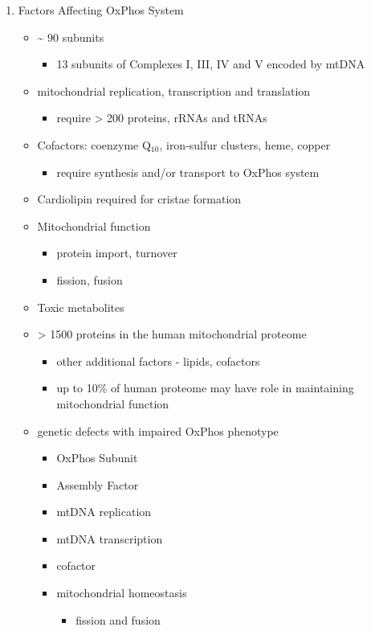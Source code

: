 \documentclass{scrartcl}
\begin{document}
\begin{enumerate}
\item Factors Affecting OxPhos System
\label{sec:org8dfa63d}
\begin{itemize}
\item \textasciitilde{} 90 subunits
\begin{itemize}
\item 13 subunits of Complexes I, III, IV and V encoded by mtDNA
\end{itemize}
\item mitochondrial replication, transcription and translation
\begin{itemize}
\item require \textgreater{} 200 proteins, rRNAs and tRNAs
\end{itemize}
\item Cofactors: coenzyme Q\(_{\text{10}}\), iron-sulfur clusters, heme, copper
\begin{itemize}
\item require synthesis and/or transport to OxPhos system
\end{itemize}
\item Cardiolipin required for cristae formation
\item Mitochondrial function
\begin{itemize}
\item protein import, turnover
\item fission, fusion
\end{itemize}
\item Toxic metabolites
\item \textgreater{} 1500 proteins in the human mitochondrial proteome
\begin{itemize}
\item other additional factors - lipids, cofactors
\item up to 10\% of human proteome may have role in maintaining mitochondrial function
\end{itemize}

\item genetic defects with impaired OxPhos phenotype 
\begin{itemize}
\item OxPhos Subunit
\item Assembly Factor
\item mtDNA replication
\item mtDNA transcription
\item cofactor
\item mitochondrial homeostasis
\begin{itemize}
\item fission and fusion
\end{itemize}
\end{itemize}
\end{itemize}
\end{enumerate}
\end{document}
